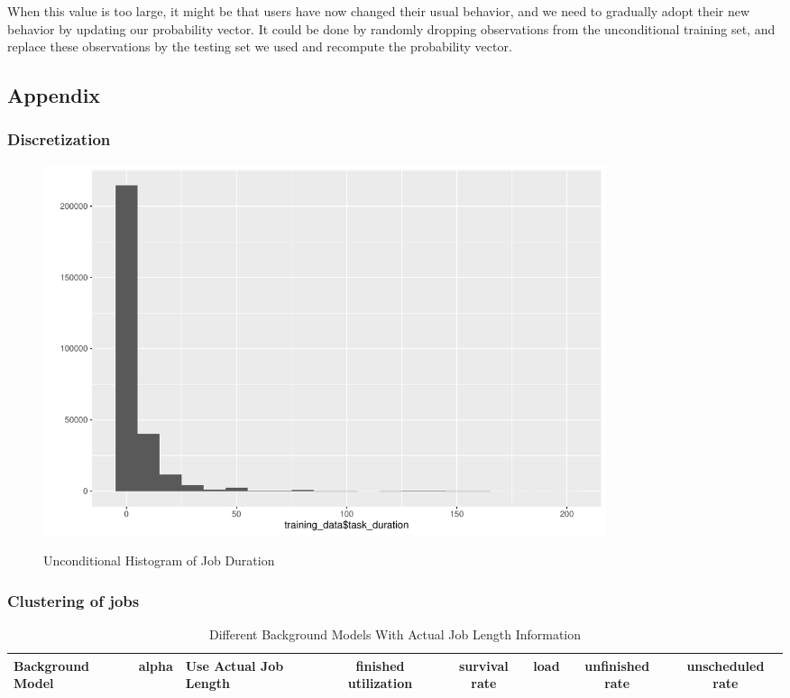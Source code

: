 \documentclass{article}
\begin{document}
\begin{flushleft}
When this value is too large, it might be that users have now changed their
usual behavior, and we need to gradually adopt their new behavior by updating
our probability vector. It could be done by randomly dropping observations from
the unconditional training set, and replace these observations by the testing
set we used and recompute the probability vector.
\end{flushleft}

\subsection{Appendix}

\subsubsection{Discretization}

\begin{figure}[htbp]
\caption{Unconditional Histogram of Job Duration}
\centering
\includegraphics[width = 0.8\textwidth]{uncondional_hist}
\label{fig:fig2.2.1}
\end{figure}

\subsubsection{Clustering of jobs}

\begin{longtable}[htbp]{l|l|l|*{5}{c}}
  \caption{Different Background Models With Actual Job Length Information}
  \label{tab:tab2.3.1}\\
  \textbf{Background Model} & \textbf{alpha} & \textbf{Use Actual Job Length} & \textbf{finished utilization} & \textbf{survival rate} &
  \textbf{load} & \textbf{unfinished rate} & \textbf{unscheduled rate} \\
  \hline
\end{longtable}
  
\end{document}
